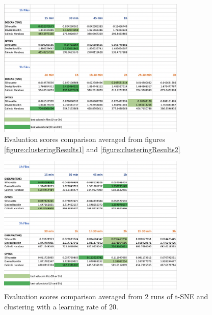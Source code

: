 \begin{figure}
  \centering
  \includegraphics[width=0.8\textwidth]{./images/clusteringResults/clusteringResults3.png}
  \caption{Evaluation scores comparison averaged from figures \ref{figure:clusteringResults1} and \ref{figure:clusteringResults2}}
  \label{figure:clusteringResults3}
\end{figure}

\begin{figure}
  \centering
  \includegraphics[width=0.8\textwidth]{./images/clusteringResults/clusteringResults4.png}
  \caption{Evaluation scores comparison averaged from 2 runs of t-SNE and clustering with a learning rate of 20.}
  \label{figure:clusteringResults4}
\end{figure}

